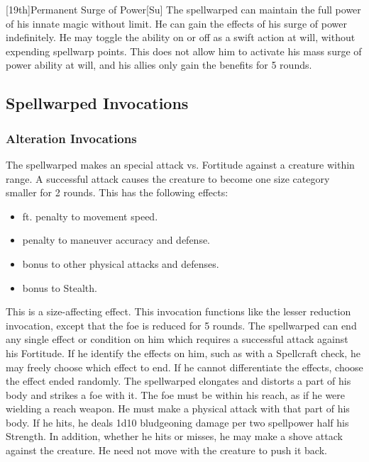 [19th]{Permanent Surge of Power}[Su]
The spellwarped can maintain the full power of his innate magic without limit.
He can gain the effects of his surge of power indefinitely.
He may toggle the ability on or off as a swift action at will, without expending spellwarp points.
This does not allow him to activate his mass surge of power ability at will, and his allies only gain the benefits for 5 rounds.

\subsection{Spellwarped Invocations}\label{Spellwarped Invocations}

\subsubsection{Alteration Invocations}
The spellwarped makes an special attack vs. Fortitude against a creature within \rngclose range.
A successful attack causes the creature to become one size category smaller for 2 rounds.
This has the following effects:
\begin{itemize}
    \item {} ft.
        penalty to movement speed.
    \item {} penalty to maneuver accuracy and defense.
    \item {} bonus to other physical attacks and defenses.
    \item {} bonus to Stealth.
\end{itemize}
This is a size-affecting effect.
This invocation functions like the lesser reduction invocation, except that the foe is reduced for 5 rounds.
The spellwarped can end any single effect or condition on him which requires a successful attack against his Fortitude.
If he identify the effects on him, such as with a Spellcraft check, he may freely choose which effect to end.
If he cannot differentiate the effects, choose the effect ended randomly.
The spellwarped elongates and distorts a part of his body and strikes a foe with it.
The foe must be within his reach, as if he were wielding a reach weapon.
He must make a physical attack with that part of his body.
If he hits, he deals 1d10 bludgeoning damage per two spellpower \add half his Strength.
In addition, whether he hits or misses, he may make a shove attack against the creature.
He need not move with the creature to push it back.
